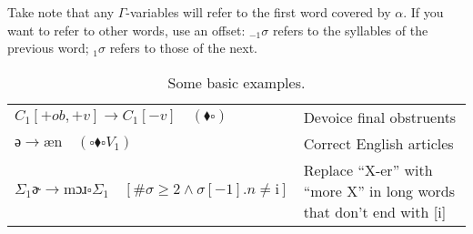 \documentclass{book}
\begin{document}
Take note that any $\Gamma$-variables will refer to the first word covered by $\alpha$. If you want to refer to other words, use an offset: $_{-1}\sigma$ refers to the syllables of the previous word; $_1\sigma$ refers to those of the next.

\begin{table}[h]
  \caption{Some basic examples.}
  \centering
  \begin{tabu} to \linewidth {|l|X|}
    \hline
    $C_1[+ob,+v] \rightarrow C_1[-v] \quad(\blacklozenge \square)$ & Devoice final obstruents \\
    $\text{ə} \rightarrow \text{æn} \quad(\square \blacklozenge \square V_1)$ & Correct English articles \\
    $\Sigma_1 \text{ɚ} \rightarrow \text{mɔɹ} \square \Sigma_1 \quad[\#\sigma \ge 2 \land \sigma[-1].n \ne \text{i}]$ & Replace ``X-er'' with ``more X'' in long words that don't end with [i] \\
    \hline
  \end{tabu}
\end{table}
\end{document}
